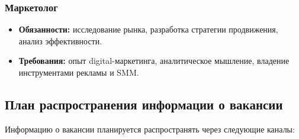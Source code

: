 \documentclass[14pt, russian]{matmex-diploma-custom}
\begin{document}
\subsubsection{Маркетолог}
\begin{itemize}
  \item \textbf{Обязанности:} исследование рынка, разработка стратегии продвижения, анализ эффективности.
  \item \textbf{Требования:} опыт digital-маркетинга, аналитическое мышление, владение инструментами рекламы и SMM.
\end{itemize}

\subsection{План распространения информации о вакансии}
Информацию о вакансии планируется распространять через следующие каналы:
\end{document}
